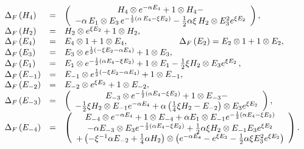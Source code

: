 \begin{equation}
\begin{array}{lcl}
\Delta _{F}\left( H_{4}\right)  & = & \left(
\begin{array}{c}
H_{4}\otimes e^{-\alpha { E }_{4}}+1\otimes H_{4}-
\\
-\alpha \, E_1 \otimes E_3 \, e^{-\frac{1}{2}
\left( \alpha \,{ E }_{4}-\xi{ E }%
_{2}\right) }-\frac{1}{2}\alpha \xi
 \,H_{2}\otimes E_3^{2}e^{\xi{ E }_{2}}%
\end{array}%
\right) ,
 \\
\Delta _{F}\left( H_{2}\right)  & = & H_{2}\otimes e^{\xi{ E }%
_{2}}+1\otimes H_{2},
\\
\Delta _{F}\left( { E }_{4}\right)  & = & { E }%
_{4}\otimes 1+1\otimes { E }_{4},
\qquad\qquad\qquad
\Delta _{F}\left( {E }_{2}\right)   =  { E } _{2}\otimes 1+1\otimes { E }_{2},
\\
\Delta _{F}\left( E_3\right)
 & = & E_3\otimes e^{\frac{1}{2}\left(- \xi {E }%
_{2}- \alpha { E }_{4}\right) }+1\otimes E_3,
\\
\Delta _{F}\left( E_1\right)
 & = &
 E_1\otimes e^{-\frac{1}{2}\left(  \alpha { E
}_{4}- \xi { E }_{2}\right) }+1\otimes E_1- \frac{1}{2} \xi
H_{2}\otimes E_{3} e^{\xi { E }_{2}}\, ,
\\
\Delta _{F}\left( E_{-1}\right)
  & = & E_{-1}\otimes e^{\frac{1}{2}\left(- \xi { %
E }_{2}- \alpha { E }_{4}\right) }+1\otimes E_{-1},
\\
\Delta _{F}\left( E_{-2}\right)  & =
& E_{-2}\otimes e^{ \xi { E }%
_{2}}+1\otimes E_{-2}, \\
\Delta _{F}\left( E_{-3}\right)  & = & \left(
\begin{array}{c}
E_{-3}\otimes e^{-\frac{1}{2}\left( \alpha { E }_{4}
- \xi { E }%
_{2}\right) }+1\otimes E_{-3}- \\
-  \frac{1}{2} \xi H_{2}\otimes E_{-1}e^{-\alpha E_{4}}
+  \alpha \left(\frac{1}{4}\xi H_2 - E_{-2}\right)
\otimes E_3 e^{ \xi { E }_{2}}%
\end{array}%
\right) , \\
\Delta _{F}\left( E_{-4}\right)  & = & \left(
\begin{array}{c}
E_{-4}\otimes e^{- \alpha { E }_{4}}
+1\otimes E_{-4}+ \alpha E_1\otimes E_{-1}e^{-\frac{%
1}{2}\left(  \alpha { E }_{4} -\xi { E }_{2}\right) } \\
- \alpha E_{-3}
 \otimes E_3 e^{-\frac{1}{2}\left(  \alpha {E
}_{4}- \xi { E }_{2}\right) }+\frac{1}{2}  \alpha \xi
H_{2}\otimes E_{-1}E_3e^{ \xi { E }_{2}} \\
+\left( - \xi^{-1} \alpha E_{-2}+\frac{1}{4}  \alpha H_{2}\right)
\otimes \left( e^{- \alpha { E }%
_{4}}-e^{\xi { E }_{2}} -\frac{1}{2} \alpha \xi E_3^{2}e^{ \xi {
E }_{2}}\right)
\end{array}%
\right) .%
\end{array}%
\end{equation}

